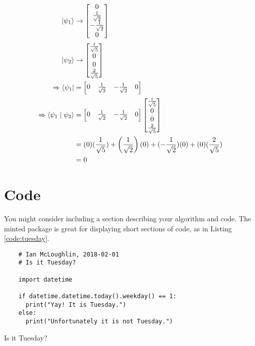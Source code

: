 \begin{align}
\ket{\psi_1} &\rightarrow \begin{bmatrix} 0 \\ \frac{1}{\sqrt{2}} \\ -\frac{1}{\sqrt{2}} \\ 0 \end{bmatrix} \\
\ket{\psi_2} &\rightarrow \begin{bmatrix} \frac{i}{\sqrt{5}} \\ 0 \\ 0 \\ \frac{2}{\sqrt{5}} \end{bmatrix} \\
\Rightarrow \bra{\psi_1} &= \begin{bmatrix} 0 & \frac{1}{\sqrt{2}} & -\frac{1}{\sqrt{2}} & 0 \end{bmatrix} \\
\Rightarrow \braket{\psi_1 \mid \psi_2} &= \begin{bmatrix} 0 & \frac{1}{\sqrt{2}} & -\frac{1}{\sqrt{2}} & 0 \end{bmatrix} \begin{bmatrix} \frac{i}{\sqrt{5}} \\ 0 \\ 0 \\ \frac{2}{\sqrt{5}} \end{bmatrix} \\
&= (0)(\frac{1}{\sqrt{5}}) + \left(\frac{1}{\sqrt{2}}\right)(0) + (-\frac{1}{\sqrt{2}})(0) + (0)(\frac{2}{\sqrt{5}}) \\
&= 0
\end{align}


\section{Code}


You might consider including a section describing your algorithm and code.
The minted package is great for displaying short sections of code, as in 
Listing \ref{code:tuesday}.



\begin{listing}[H]
  \begin{verbatim}
    # Ian McLoughlin, 2018-02-01
    # Is it Tuesday?

    import datetime

    if datetime.datetime.today().weekday() == 1:
      print("Yay! It is Tuesday.")
    else:
      print("Unfortunately it is not Tuesday.")
  \end{verbatim}
  \caption{Is it Tuesday?}
  \label{code:tuesday}
\end{listing}

\lipsum[10-15]